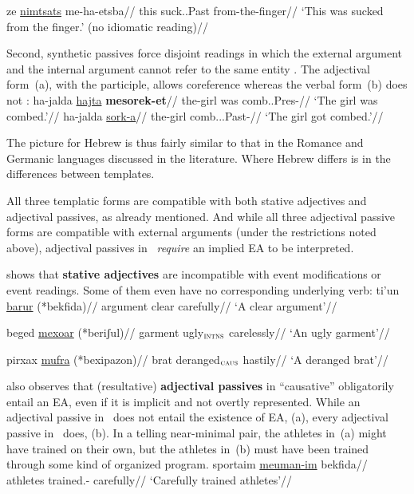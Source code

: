     \a
        \begingl
        \gla {}ze \underline{nimtsats} me-ha-etsba//
        \glb this suck..Past from-the-finger//
        \glft `This was sucked from the finger.' (no idiomatic reading)//
        \endgl
\xe

Second, synthetic passives force disjoint readings in which the external argument and the internal argument cannot refer to the same entity \citep{bakeretal89}. The adjectival form~(\nextx a), with the participle, allows coreference whereas the verbal form~(\nextx b) does not \citep[720]{sichel09}:
\pex \label{ex:disjoint}
    \a \begingl
        \gla {}ha-jalda \underline{hajta} \textbf{mesorek-et}//
        \glb the-girl was comb..Pres-//
        \glft `The girl was combed.'//
        \endgl
    \a
        \begingl
        \gla {}ha-jalda \underline{sork-a}//
        \glb the-girl comb...Past-//
        \glft `The girl got combed.'//
        \endgl
\xe

The picture for Hebrew is thus fairly similar to that in the Romance and Germanic languages discussed in the literature. Where Hebrew differs is in the differences between templates.

All three templatic forms are compatible with both stative adjectives and adjectival passives, as already mentioned. And while all three adjectival passive forms are compatible with external arguments (under the restrictions noted above), adjectival passives in \mhuf~\emph{require} an implied EA to be interpreted.

\citet[170]{doron14adj} shows that \textbf{stative adjectives} are incompatible with event modifications or event readings. Some of them even have no corresponding underlying verb:
\pex
	\a \begingl
		\gla ti'un \underline{barur} (*bekfida)//
		\glb argument clear \phantom{(*}carefully//
		\glft `A clear argument'//
	\endgl

	\a \begingl
		\gla beged \underline{mexoar} (*beriʃul)//
		\glb garment ugly$_{\text{\gsc{INTNS}}}$ \phantom{(*}carelessly//
		\glft `An ugly garment'//
	\endgl

	\a \begingl
		\gla pirxax \underline{mufra} (*bexipazon)//
		\glb brat deranged$_{\text{\gsc{CAUS}}}$ \phantom{(*}hastily//
		\glft `A deranged brat'//
	\endgl
\xe

\citet[175]{doron14adj} also observes that (resultative) \textbf{adjectival passives} in ``causative'' {\mhuf} obligatorily entail an EA, even if it is implicit and not overtly represented. While an adjectival passive in \mpua~does not entail the existence of EA, (\nextx a), every adjectival passive in \mhuf~does, (\nextx b). In a telling near-minimal pair, the athletes in~(\nextx a) might have trained on their own, but the athletes in~(\nextx b) must have been trained through some kind of organized program.
\pex\label{ex:sportaim}
	\a \begingl
		\gla\rightcomment{(\mpua)}sportaim \underline{meuman-im} bekfida//
		\glb athletes trained.- carefully//
		\glft `Carefully trained athletes'//
	\endgl
	
